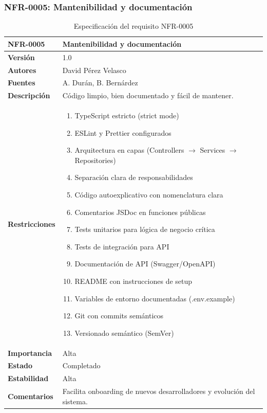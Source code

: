 \documentclass[11pt, a4paper]{article}
\begin{document}
\subsubsection{NFR-0005: Mantenibilidad y documentación}

\begin{table}[H]
    \centering
    \small
    \begin{tabular}{|p{4cm}|p{10cm}|}
    \hline
    \textbf{NFR-0005} & Mantenibilidad y documentación \\
    \hline
    \textbf{Versión} & 1.0 \\
    \hline
    \textbf{Autores} & David Pérez Velasco \\
    \hline
    \textbf{Fuentes} & A. Durán, B. Bernárdez \\
    \hline
    \textbf{Descripción} & Código limpio, bien documentado y fácil de mantener. \\
    \hline
    \textbf{Restricciones} & 
    \begin{enumerate}
        \item TypeScript estricto (strict mode)
        \item ESLint y Prettier configurados
        \item Arquitectura en capas (Controllers $\rightarrow$ Services $\rightarrow$ Repositories)
        \item Separación clara de responsabilidades
        \item Código autoexplicativo con nomenclatura clara
        \item Comentarios JSDoc en funciones públicas
        \item Tests unitarios para lógica de negocio crítica
        \item Tests de integración para API
        \item Documentación de API (Swagger/OpenAPI)
        \item README con instrucciones de setup
        \item Variables de entorno documentadas (.env.example)
        \item Git con commits semánticos
        \item Versionado semántico (SemVer)
    \end{enumerate} \\
    \hline
    \textbf{Importancia} & Alta \\
    \hline
    \textbf{Estado} & Completado \\
    \hline
    \textbf{Estabilidad} & Alta \\
    \hline
    \textbf{Comentarios} & Facilita onboarding de nuevos desarrolladores y evolución del sistema. \\
    \hline
    \end{tabular}
    \caption{Especificación del requisito NFR-0005}
\end{table}
\end{document}
